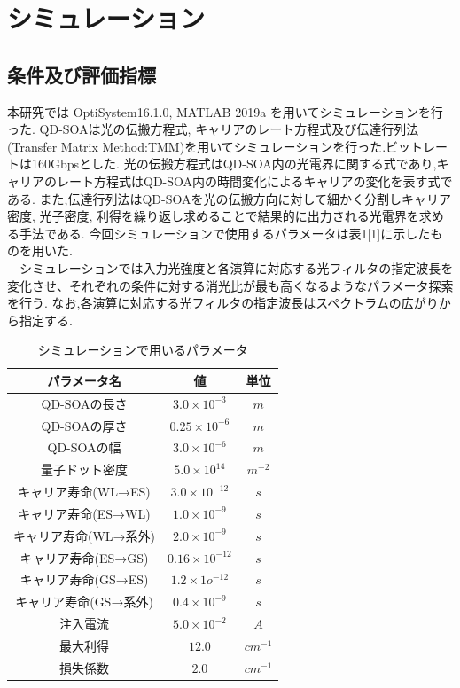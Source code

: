\documentclass[dvipdfmx]{ujarticle}
\begin{document}
\section{シミュレーション}
\subsection{条件及び評価指標}
本研究では OptiSystem16.1.0, MATLAB 2019a を用いてシミュレーションを行った.
QD-SOAは光の伝搬方程式, キャリアのレート方程式及び伝達行列法(Transfer Matrix Method:TMM)を用いてシミュレーションを行った.ビットレートは160Gbpsとした.
光の伝搬方程式はQD-SOA内の光電界に関する式であり,キャリアのレート方程式はQD-SOA内の時間変化によるキャリアの変化を表す式である.
また,伝達行列法はQD-SOAを光の伝搬方向に対して細かく分割しキャリア密度, 光子密度, 利得を繰り返し求めることで結果的に出力される光電界を求める手法である.
今回シミュレーションで使用するパラメータは表1[1]に示したものを用いた.\\
　シミュレーションでは入力光強度と各演算に対応する光フィルタの指定波長を変化させ、それぞれの条件に対する消光比が最も高くなるようなパラメータ探索を行う.
なお,各演算に対応する光フィルタの指定波長はスペクトラムの広がりから指定する.

\begin{table}[H]
  \caption{シミュレーションで用いるパラメータ}
  \centering
    \begin{tabular}{ccc}
      \hline
      パラメータ名 & 値 & 単位 \\
      \hline
      QD-SOAの長さ & $ 3.0 \times 10^{-3} $ & $m$\\
      QD-SOAの厚さ & $ 0.25 \times 10^{-6} $ & $m$\\
      QD-SOAの幅 & $ 3.0 \times 10^{-6} $ & $m$\\
      量子ドット密度 & $ 5.0 \times 10^{14} $ & $m^{-2}$\\
      キャリア寿命(WL→ES) & $ 3.0 \times 10^{-12} $ & $s$ \\
      キャリア寿命(ES→WL) & $ 1.0 \times 10^{-9} $ & $s$\\
      キャリア寿命(WL→系外) & $ 2.0 \times 10^{-9} $ & $s$\\
      キャリア寿命(ES→GS) & $ 0.16 \times 10^{-12} $ & $s$\\
      キャリア寿命(GS→ES) & $ 1.2 \times 1o^{-12} $ & $s$\\
      キャリア寿命(GS→系外) & $ 0.4 \times 10^{-9} $ & $s$\\
      注入電流 & $5.0 \times 10^{-2}  $ & $A$\\
      最大利得 & $12.0 $ & $cm^{-1}$\\
      損失係数 & $2.0$ & $cm^{-1}$\\

      \hline

    \end{tabular}
\end{table}
\end{document}
